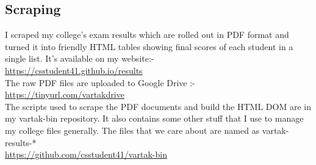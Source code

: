 \documentclass[14pt]{extarticle}
\newcommand\tab[1][1cm]{\hspace*{#1}}
\begin{document}
\subsection{Scraping}
I scraped my college's exam results which are rolled out in PDF format and
turned it into friendly HTML tables showing final scores of each student in a single list.
It's available on my website:-\\
\tab \url{https://csstudent41.github.io/results}\\
The raw PDF files are uploaded to Google Drive :-\\
\tab \url{https://tinyurl.com/vartakdrive}\\
The scripts used to scrape the PDF documents and build the HTML DOM are in my vartak-bin repository.
It also contains some other stuff that I use to manage my college files generally.
The files that we care about are named as vartak-results-*\\
\tab \url{https://github.com/csstudent41/vartak-bin}\\
\end{document}
